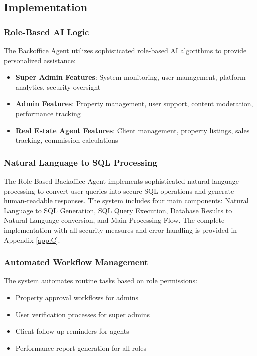 \subsection{Implementation}
\subsubsection{Role-Based AI Logic}
The Backoffice Agent utilizes sophisticated role-based AI algorithms to provide personalized assistance:

\begin{itemize}
    \item \textbf{Super Admin Features}: System monitoring, user management, platform analytics, security oversight
    \item \textbf{Admin Features}: Property management, user support, content moderation, performance tracking
    \item \textbf{Real Estate Agent Features}: Client management, property listings, sales tracking, commission calculations
\end{itemize}

\subsubsection*{Natural Language to SQL Processing}
The Role-Based Backoffice Agent implements sophisticated natural language processing to convert user queries into secure SQL operations and generate human-readable responses. The system includes four main components: Natural Language to SQL Generation, SQL Query Execution, Database Results to Natural Language conversion, and Main Processing Flow. The complete implementation with all security measures and error handling is provided in Appendix \ref{app:C}.

\subsubsection{Automated Workflow Management}
The system automates routine tasks based on role permissions:
\begin{itemize}
    \item Property approval workflows for admins
    \item User verification processes for super admins
    \item Client follow-up reminders for agents
    \item Performance report generation for all roles
\end{itemize}

